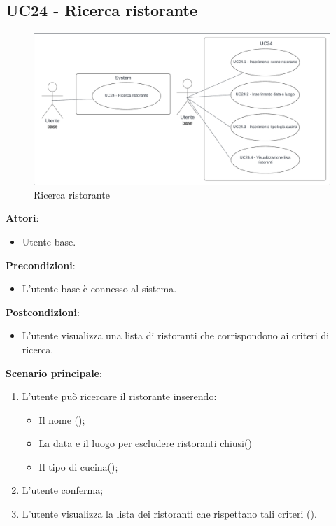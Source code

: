 \subsection{UC24 - Ricerca ristorante}\label{usecase:24}

\begin{figure}[H]
    \centering
    \includegraphics[width=0.9\linewidth]{ucd/UCD24.png}
    \caption{Ricerca ristorante}
\end{figure}

\textbf{Attori}:
\begin{itemize}
    \item Utente base.
\end{itemize}
\textbf{Precondizioni}:
\begin{itemize}
    \item L'utente base è connesso al sistema.
\end{itemize}
\textbf{Postcondizioni}:
\begin{itemize}
    \item L'utente visualizza una lista di ristoranti che corrispondono ai criteri di ricerca.
\end{itemize}
\textbf{Scenario principale}:
\begin{enumerate}
    \item L'utente può ricercare il ristorante inserendo:
    \begin{itemize}
        \item Il nome ();
        \item La data e il luogo per escludere ristoranti chiusi()
        \item Il tipo di cucina();
    \end{itemize}
    \item L'utente conferma;
    \item L'utente visualizza la lista dei ristoranti che rispettano tali criteri ().
\end{enumerate}

